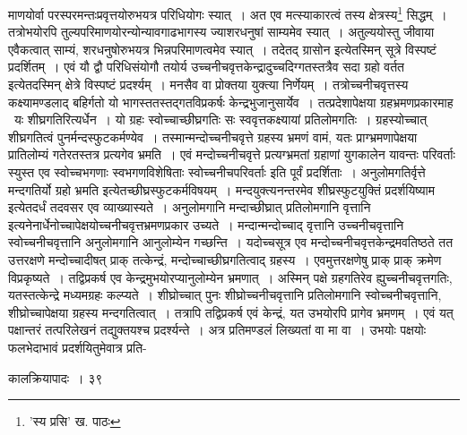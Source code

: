 \documentclass[11pt, openany]{book}
\begin{document}
{{{{{\vspace{0.3cm}
\noindent माणयोर्वा परस्परमन्तःप्रवृत्तयोरुभयत्र परिधियोगः स्यात्~। अत एव मत्स्याकारत्वं तस्य क्षेत्रस्य\renewcommand{\thefootnote}{१}\footnote{'स्य प्रसि' ख. पाठः} सिद्धम्~। तत्रोभयोरपि
तुल्यपरिमाणयोरन्योन्यावगाढभागस्य ज्याशरधनुषां साम्यमेव स्यात्~। अतुल्ययोस्तु जीवाया एवैकत्वात् साम्यं, शरधनुषोरुभयत्र भिन्नपरिमाणत्वमेव स्यात्~। तदेतद् {\qt ग्रासोन} इत्येतस्मिन् सूत्रे विस्पष्टं प्रदर्शितम्~। एवं यौ द्वौ परिधिसंयोगौ तयोर्य
उच्चनीचवृत्तकेन्द्रादुच्चदिग्गतस्तत्रैव सदा ग्रहो वर्तत इत्येतदस्मिन् क्षेत्रे विस्पष्टं प्रदर्श्यम्~। मनसैव वा प्रोक्तया युक्त्या निर्णेयम्~।
तत्रोच्चनीचवृत्तस्य कक्ष्यामण्डलाद् बहिर्गतो यो भागस्ततस्तद्गतविप्रकर्षः केन्द्रभुजानुसार्येव~। तत्प्रदेशापेक्षया ग्रहभ्रमणप्रकारमाह  \textendash\ यः शीघ्रगतिरित्यर्धेन~। यो ग्रहः स्वोच्चाच्छीघ्रगतिः सः स्ववृत्तकक्ष्यायां प्रतिलोमगतिः~। ग्रहस्योच्चात् शीघ्रगतित्वं पुनर्मन्दस्फुटकर्मण्येव~। तस्मान्मन्दोच्चनीचवृत्ते ग्रहस्य भ्रमणं वामं, यतः प्राग्भ्रमणापेक्षया प्रातिलोम्यं गतेरतस्तत्र प्रत्यगेव भ्रमति~। एवं मन्दोच्चनीचवृत्ते प्रत्यग्भ्रमतां ग्रहाणां युगकालेन यावन्तः परिवर्ताः स्युस्त एव {\qt स्वोच्चभगणाः स्वभगणविशेषिताः स्वोच्चनीचपरिवर्ताः} इति पूर्वं प्रदर्शिताः~। {\qt अनुलोमगतिर्वृत्ते मन्दगतिर्यो ग्रहो भ्रमति} इत्येतच्छीघ्रस्फुटकर्मविषयम्~। मन्दयुक्त्यनन्तरमेव शीघ्रस्फुटयुक्तिं
प्रदर्शयिष्याम इत्येतदर्धं तदवसर एव व्याख्यास्यते~। {\qt अनुलोमगानि मन्दाच्छीघ्रात् प्रतिलोमगानि वृत्तानि}
इत्यनेनार्धेनोच्चापेक्षयोच्चनीचवृत्तभ्रमणप्रकार उच्यते~। मन्दान्मन्दोच्चाद् वृत्तानि उच्चनीचवृत्तानि स्वोच्चनीचवृत्तानि अनुलोमगानि आनुलोम्येन गच्छन्ति~। यदोच्चसूत्र एव मन्दोच्चनीचवृत्तकेन्द्रमवतिष्ठते तत उत्तरक्षणे मन्दोच्चादीषत् प्राक् तत्केन्द्रं, मन्दोच्चाच्छीघ्रगतित्वाद् ग्रहस्य~। एवमुत्तरक्षणेषु प्राक् प्राक् क्रमेण विप्रकृष्यते~। तद्विप्रकर्ष एव केन्द्रमुभयोरप्यानुलोम्येन भ्रमणात्~। अस्मिन् पक्षे ग्रहगतिरेव
ह्युच्चनीचवृत्तगतिः, यतस्तत्केन्द्रे मध्यमग्रहः कल्प्यते~। शीघ्रोच्चात् पुनः शीघ्रोच्चनीचवृत्तानि प्रतिलोमगानि स्वोच्चनीचवृत्तानि, शीघ्रोच्चापेक्षया
ग्रहस्य मन्दगतित्वात्~। तत्रापि तद्विप्रकर्ष एवं केन्द्रं, यत उभयोरपि प्रागेव भ्रमणम्~। एवं यत् पक्षान्तरं तत्परिलेखनं तद्युक्तयश्च प्रदर्श्यन्ते~। अत्र
प्रतिमण्डलं लिख्यतां वा मा वा~। उभयोः पक्षयोः फलभेदाभावं प्रदर्शयितुमेवात्र प्रति-
 
\newpage

\vspace{3cm} \hspace{4cm}कालक्रियापादः~।\hspace{4cm} ३९

}}}}}
\end{document}

